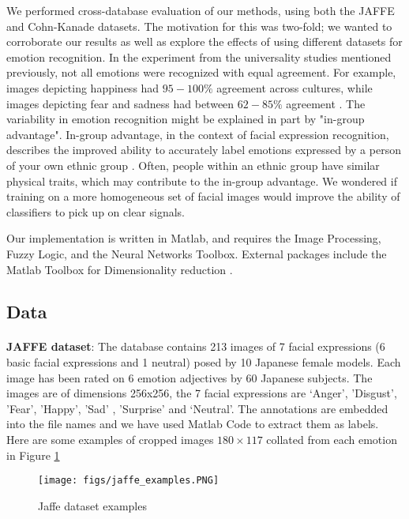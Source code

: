 \documentclass[10pt,twocolumn,letterpaper]{article}
\begin{document}
We performed cross-database evaluation of our methods, using both the JAFFE and Cohn-Kanade datasets. The motivation for this was two-fold; we wanted to corroborate our results as well as explore the effects of using different datasets for emotion recognition. In the experiment from the universality studies mentioned previously, not all emotions were recognized with equal agreement. For example, images depicting happiness had $95-100\%$ agreement across cultures, while images depicting fear and sadness had between $62-85\%$ agreement \cite{universality_studies}. The variability in emotion recognition might be explained in part by "in-group advantage". In-group advantage, in the context of facial expression recognition, describes the improved ability to accurately label emotions expressed by a person of your own ethnic group \cite{universality}. Often, people within an ethnic group have similar physical traits, which may contribute to the in-group advantage. We wondered if training on a more homogeneous set of facial images would improve the ability of classifiers to pick up on clear signals.

Our implementation is written in Matlab, and requires the Image Processing, Fuzzy Logic, and the Neural Networks Toolbox. External packages include the Matlab Toolbox for Dimensionality reduction \cite{drtoolbox}.

\subsection{Data}
\paragraph{}
\textbf{JAFFE dataset}: The database \cite{jaffe} contains 213 images of 7 facial expressions (6 basic facial expressions and 1 neutral) posed by 10 Japanese female models. Each image has been rated on 6 emotion adjectives by 60 Japanese subjects. The images are of dimensions 256x256, the 7 facial expressions are ‘Anger’, ’Disgust’, ’Fear’, ’Happy’, ’Sad’ , ’Surprise’ and ‘Neutral’.  The annotations are embedded into the file names and we have used Matlab Code to extract them as labels. Here are some examples of cropped images $180\times117$ collated from each emotion in Figure \ref{fig:jaffe_examples}

\begin{figure}[h]
\texttt{[image: figs/jaffe\_examples.PNG]}
\caption{Jaffe dataset examples}
\label{fig:jaffe_examples}
\end{figure}
\end{document}
